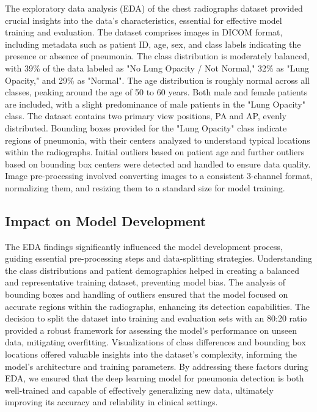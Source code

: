 The exploratory data analysis (EDA) of the chest radiographs dataset provided crucial insights into the data's characteristics, essential for effective model training and evaluation. The dataset comprises images in DICOM format, including metadata such as patient ID, age, sex, and class labels indicating the presence or absence of pneumonia. The class distribution is moderately balanced, with 39\% of the data labeled as "No Lung Opacity / Not Normal," 32\% as "Lung Opacity," and 29\% as "Normal". The age distribution is roughly normal across all classes, peaking around the age of 50 to 60 years. Both male and female patients are included, with a slight predominance of male patients in the "Lung Opacity" class. The dataset contains two primary view positions, PA and AP, evenly distributed. Bounding boxes provided for the "Lung Opacity" class indicate regions of pneumonia, with their centers analyzed to understand typical locations within the radiographs. Initial outliers based on patient age and further outliers based on bounding box centers were detected and handled to ensure data quality. Image pre-processing involved converting images to a consistent 3-channel format, normalizing them, and resizing them to a standard size for model training.

\subsection{Impact on Model Development}
\label{subsec:chap2 section 3.2}

The EDA findings significantly influenced the model development process, guiding essential pre-processing steps and data-splitting strategies. Understanding the class distributions and patient demographics helped in creating a balanced and representative training dataset, preventing model bias. The analysis of bounding boxes and handling of outliers ensured that the model focused on accurate regions within the radiographs, enhancing its detection capabilities. The decision to split the dataset into training and evaluation sets with an 80:20 ratio provided a robust framework for assessing the model's performance on unseen data, mitigating overfitting. Visualizations of class differences and bounding box locations offered valuable insights into the dataset's complexity, informing the model's architecture and training parameters. By addressing these factors during EDA, we ensured that the deep learning model for pneumonia detection is both well-trained and capable of effectively generalizing new data, ultimately improving its accuracy and reliability in clinical settings.
